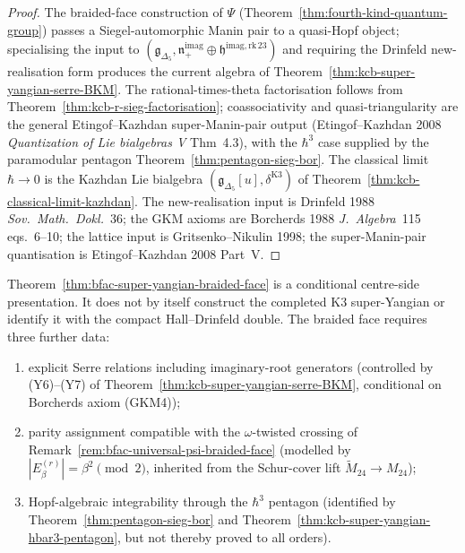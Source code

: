 \begin{proof}
The braided-face construction of $\Psi$
(Theorem~\ref{thm:fourth-kind-quantum-group}) passes a
Siegel-automorphic Manin pair to a quasi-Hopf object; specialising the
input to
$(\mathfrak{g}_{\Delta_5},\mathfrak{n}_+^{\mathrm{imag}}
 \oplus\mathfrak{h}^{\mathrm{imag,rk\,23}})$
and requiring the Drinfeld new-realisation form produces the
current algebra of Theorem~\ref{thm:kcb-super-yangian-serre-BKM}. The
rational-times-theta factorisation follows from
Theorem~\ref{thm:kcb-r-sieg-factorisation}; coassociativity and
quasi-triangularity are the general Etingof--Kazhdan super-Manin-pair
output (Etingof--Kazhdan 2008 \emph{Quantization of Lie bialgebras V}
Thm~4.3), with the $\hbar^3$ case supplied by the paramodular pentagon
Theorem~\ref{thm:pentagon-sieg-bor}. The classical limit $\hbar\to 0$
is the Kazhdan Lie bialgebra
$(\mathfrak{g}_{\Delta_5}[u],\delta^{\mathrm{K3}})$ of
Theorem~\ref{thm:kcb-classical-limit-kazhdan}. The new-realisation
input is Drinfeld 1988 \emph{Sov.~Math.~Dokl.}~36; the GKM axioms are
Borcherds 1988 \emph{J.~Algebra}~115 eqs.~6--10; the lattice input is
Gritsenko--Nikulin 1998; the super-Manin-pair quantisation is
Etingof--Kazhdan 2008 Part~V.
\end{proof}

\begin{remark}
\label{rem:bfac-super-yangian-resolution}
Theorem~\ref{thm:bfac-super-yangian-braided-face} is a conditional
centre-side presentation. It does not by itself construct the completed
K3 super-Yangian or identify it with the compact Hall--Drinfeld double.
The braided face requires three further data:
\begin{enumerate}[label=\textup{(\alph*)}]
\item explicit Serre relations including imaginary-root generators
(controlled by (Y6)--(Y7) of
Theorem~\ref{thm:kcb-super-yangian-serre-BKM}, conditional on Borcherds axiom
(GKM4));
\item parity assignment compatible with the $\omega$-twisted crossing of
Remark~\ref{rem:bfac-universal-psi-braided-face} (modelled by
$|E_\beta^{(r)}| = \beta^2\pmod 2$, inherited from the Schur-cover
lift $\widetilde{M}_{24}\to M_{24}$);
\item Hopf-algebraic integrability through the $\hbar^3$ pentagon
(identified by Theorem~\ref{thm:pentagon-sieg-bor} and
Theorem~\ref{thm:kcb-super-yangian-hbar3-pentagon}, but not thereby
proved to all orders).
\end{enumerate}
\end{remark}

